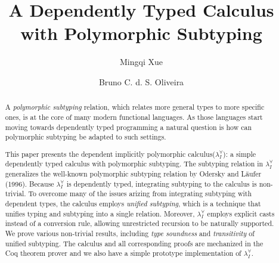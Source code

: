 \documentclass{llncs}
\newcommand{\system}[0]{the dependent implicitly polymorphic calculus\xspace}
\newcommand{\name}[0]{$\lambda_{I}^{\forall}$\xspace}
\begin{document}
\title{A Dependently Typed Calculus with Polymorphic Subtyping}

\author{Mingqi Xue \and Bruno C. d. S. Oliveira}

\maketitle

\begin{abstract}
  A \emph{polymorphic subtyping} relation, which relates more general types
  to more specific ones, is at the core of many modern functional languages.
  As those languages start moving towards dependently typed programming a
  natural question is how can polymorphic subtyping be adapted to such settings.

  This paper presents \system (\name): a simple dependently typed calculus
  with polymorphic subtyping. The subtyping relation in \name
  generalizes the well-known polymorphic subtyping relation by
  Odersky and L\"aufer (1996). Because \name is dependently typed,
  integrating subtyping to the calculus is non-trivial. To overcome
  many of the issues arizing from integrating subtyping with dependent
  types, the calculus employs \emph{unified subtyping}, which is a technique
  that unifies typing and subtyping into a single relation. Moreover, \name
  employs explicit casts instead of a conversion rule, allowing
  unrestricted recursion to be naturally supported.
  We prove various non-trivial results, including \emph{type soundness} and \emph{transitivity}
  of unified subtyping. The calculus and all corresponding proofs
  are mechanized in the Coq theorem prover and we also have a simple prototype
  implementation of \name.
\end{abstract}







\end{document}
